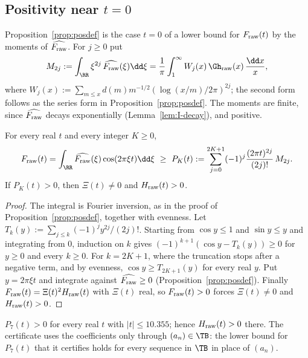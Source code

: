 \subsection{Positivity near \texorpdfstring{$t=0$}{t = 0}}\label{ssec:moments}

Proposition~\ref{prop:posdef} is the case $t=0$ of a lower bound for $F_{\rm raw}(t)$ by the moments of $\widehat{F_{\rm raw}}$. For $j\ge0$ put
\begin{equation}\label{eq:moments}
M_{2j}:=\int_\RR\xi^{2j}\,\widehat{F_{\rm raw}}(\xi)\dd\xi=\frac1\pi\int_1^\infty W_j(x)\,\Gh_{\rm raw}(x)\,\frac{\dd x}x,
\end{equation}
where $W_j(x):=\sum_{m\le x}d(m)m^{-1/2}(\log(x/m)/2\pi)^{2j}$; the second form follows as the series form in Proposition~\ref{prop:posdef}. The moments are finite, since $\widehat{F_{\rm raw}}$ decays
exponentially (Lemma~\ref{lem:I-decay}), and positive.

\begin{lemma}\label{lem:moments}
For every real $t$ and every integer $K\ge0$,
\[
F_{\rm raw}(t)=\int_\RR\widehat{F_{\rm raw}}(\xi)\cos(2\pi\xi t)\dd\xi\ \ge\ P_K(t):=\sum_{j=0}^{2K+1}(-1)^j\frac{(2\pi t)^{2j}}{(2j)!}\,M_{2j}.
\]
If $P_K(t)>0$, then $\Xi(t)\ne0$ and $H_{\rm raw}(t)>0$.
\end{lemma}

\begin{proof}
The integral is Fourier inversion, as in the proof of Proposition~\ref{prop:posdef}, together with evenness. Let
$T_k(y):=\sum_{j\le k}(-1)^jy^{2j}/(2j)!$. Starting from $\cos y\le1$ and $\sin y\le y$ and integrating from $0$, induction on $k$ gives
$(-1)^{k+1}(\cos y-T_k(y))\ge0$ for $y\ge0$ and every $k\ge0$. For $k=2K+1$, where the truncation stops after a negative term, and by evenness,
$\cos y\ge T_{2K+1}(y)$ for every real $y$. Put $y=2\pi\xi t$ and integrate against $\widehat{F_{\rm raw}}\ge0$ (Proposition~\ref{prop:posdef}).
Finally $F_{\rm raw}(t)=\Xi(t)^2H_{\rm raw}(t)$ with $\Xi(t)$ real, so $F_{\rm raw}(t)>0$ forces $\Xi(t)\ne0$ and $H_{\rm raw}(t)>0$.
\end{proof}

\begin{theorem}\label{thm:moments}
$P_7(t)>0$ for every real $t$ with $|t|\le10.355$; hence $H_{\rm raw}(t)>0$ there. The certificate uses the coefficients only through
$(a_n)\in\TB$: the lower bound for $P_7(t)$ that it certifies holds for every sequence in $\TB$ in place of $(a_n)$.
\end{theorem}

